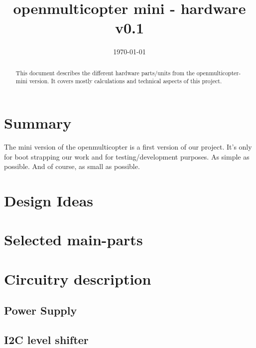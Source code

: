 \documentclass[11pt, a4paper]{article}
\title{openmulticopter mini - hardware v0.1}
\author{}
\date{\today}
\begin{document}
\maketitle

\begin{abstract}
This document describes the different hardware parts/units from the openmulticopter-mini version.
It covers mostly calculations and technical aspects of this project.
\end{abstract}

\newpage

\tableofcontents
\newpage

\section{Summary} %
\label{sec:Summary}
The mini version of the openmulticopter is a first version of our project. It’s only for boot strapping 
our work and for testing/development purposes. As simple as possible. And of course, as small as possible.

\section{Design Ideas} %
\label{sec:Design Ideas}


\section{Selected main-parts} %
\label{sec:Selected Main-Parts}


\section{Circuitry description} %
\label{sec:Circuitry description}

\subsection{Power Supply} %
\label{sub:Power Supply}


\subsection{I2C level shifter} %
\label{sub:I2C level shifter}
\end{document}
